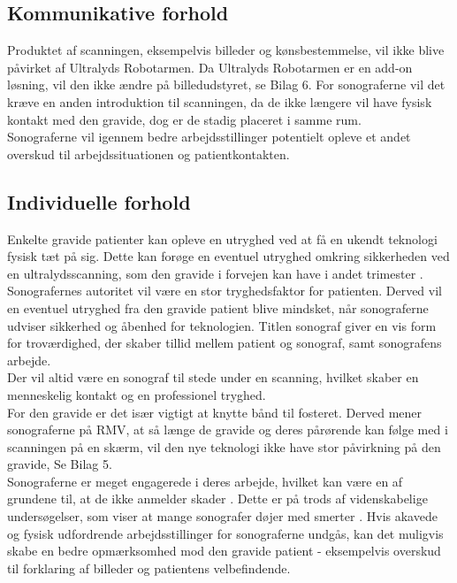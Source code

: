 \subsection{Kommunikative forhold}
Produktet af scanningen, eksempelvis billeder og kønsbestemmelse, vil ikke blive påvirket af Ultralyds Robotarmen. Da Ultralyds Robotarmen er en add-on løsning, vil den ikke ændre på billedudstyret, se Bilag 6. 
For sonograferne vil det kræve en anden introduktion til scanningen, da de ikke længere vil have fysisk kontakt med den gravide, dog er de stadig placeret i samme rum.  \\
Sonograferne vil igennem bedre arbejdsstillinger potentielt opleve et andet overskud til arbejdssituationen og patientkontakten.  

\subsection{Individuelle forhold}
Enkelte gravide patienter kan opleve en utryghed ved at få en ukendt teknologi fysisk tæt på sig. Dette kan forøge en eventuel utryghed omkring sikkerheden ved en ultralydsscanning, som den gravide i forvejen kan have i andet trimester \cite{29}. \\
Sonografernes autoritet vil være en stor tryghedsfaktor for patienten. Derved vil en eventuel utryghed fra den gravide patient blive mindsket, når sonograferne udviser sikkerhed og åbenhed for teknologien. Titlen sonograf giver en vis form for troværdighed, der skaber tillid mellem patient og sonograf, samt sonografens arbejde.\\
Der vil altid være en sonograf til stede under en scanning, hvilket skaber en menneskelig kontakt og en professionel tryghed.\\
For den gravide er det især vigtigt at knytte bånd til fosteret. Derved mener sonograferne på RMV, at så længe de gravide og deres pårørende kan følge med i scanningen på en skærm, vil den nye teknologi ikke have stor påvirkning på den gravide, Se Bilag 5. \\  
Sonograferne er meget engagerede i deres arbejde, hvilket kan være en af grundene til, at de ikke anmelder skader \cite{1} \cite{24}. Dette er på trods af videnskabelige undersøgelser, som viser at mange sonografer døjer med smerter \cite{32} \cite{24} \cite{36} . 
Hvis akavede og fysisk udfordrende arbejdsstillinger for sonograferne undgås, kan det muligvis skabe en bedre opmærksomhed mod den gravide patient - eksempelvis overskud til forklaring af billeder og patientens velbefindende.  

